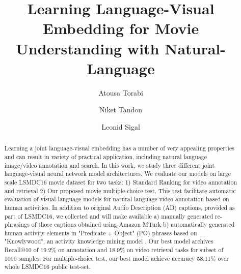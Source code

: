 \documentclass[runningheads]{llncs}
\begin{document}
\pagestyle{headings}
\mainmatter

\title{Learning Language-Visual Embedding for Movie Understanding with Natural-Language} 


\author{Atousa Torabi  \and Niket Tandon  \and Leonid Sigal  }






\maketitle

\begin{abstract}
Learning a joint language-visual embedding has a number of very appealing properties and can result in variety of practical application, including natural language image/video annotation and search. In this work, we study three different joint language-visual neural network model architectures. We evaluate our models on large scale LSMDC16 \cite{LSMDC15web,LSMDC15} movie dataset for two tasks: 1) Standard Ranking for video annotation and retrieval 2) Our proposed movie multiple-choice test. This test facilitate automatic evaluation of visual-language models for natural language video annotation based on human activities. In addition to original Audio Description (AD) captions, provided as part of LSMDC16, we collected and will make available a) manually generated re-phrasings of those captions obtained using Amazon MTurk  b) automatically generated human activity elements in "Predicate + Object" (PO) phrases based on "Knowlywood", an activity knowledge mining model \cite{Tandon2015Knowlywood}. Our best model archives Recall@10 of 19.2\% on annotation and 18.9\% on video retrieval tasks for subset of 1000 samples. For multiple-choice test, our best model achieve accuracy 58.11\% over whole LSMDC16 public test-set.  

\end{abstract}
\end{document}
